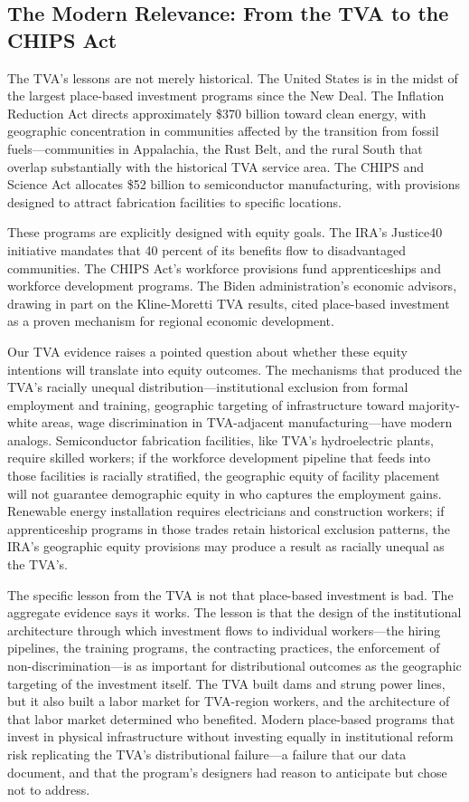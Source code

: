 \documentclass[12pt]{article}
\begin{document}
\subsection{The Modern Relevance: From the TVA to the CHIPS Act}

The TVA's lessons are not merely historical. The United States is in the midst of the largest place-based investment programs since the New Deal. The Inflation Reduction Act directs approximately \$370 billion toward clean energy, with geographic concentration in communities affected by the transition from fossil fuels---communities in Appalachia, the Rust Belt, and the rural South that overlap substantially with the historical TVA service area. The CHIPS and Science Act allocates \$52 billion to semiconductor manufacturing, with provisions designed to attract fabrication facilities to specific locations.

These programs are explicitly designed with equity goals. The IRA's Justice40 initiative mandates that 40 percent of its benefits flow to disadvantaged communities. The CHIPS Act's workforce provisions fund apprenticeships and workforce development programs. The Biden administration's economic advisors, drawing in part on the Kline-Moretti TVA results, cited place-based investment as a proven mechanism for regional economic development.

Our TVA evidence raises a pointed question about whether these equity intentions will translate into equity outcomes. The mechanisms that produced the TVA's racially unequal distribution---institutional exclusion from formal employment and training, geographic targeting of infrastructure toward majority-white areas, wage discrimination in TVA-adjacent manufacturing---have modern analogs. Semiconductor fabrication facilities, like TVA's hydroelectric plants, require skilled workers; if the workforce development pipeline that feeds into those facilities is racially stratified, the geographic equity of facility placement will not guarantee demographic equity in who captures the employment gains. Renewable energy installation requires electricians and construction workers; if apprenticeship programs in those trades retain historical exclusion patterns, the IRA's geographic equity provisions may produce a result as racially unequal as the TVA's.

The specific lesson from the TVA is not that place-based investment is bad. The aggregate evidence says it works. The lesson is that the design of the institutional architecture through which investment flows to individual workers---the hiring pipelines, the training programs, the contracting practices, the enforcement of non-discrimination---is as important for distributional outcomes as the geographic targeting of the investment itself. The TVA built dams and strung power lines, but it also built a labor market for TVA-region workers, and the architecture of that labor market determined who benefited. Modern place-based programs that invest in physical infrastructure without investing equally in institutional reform risk replicating the TVA's distributional failure---a failure that our data document, and that the program's designers had reason to anticipate but chose not to address.
\end{document}
